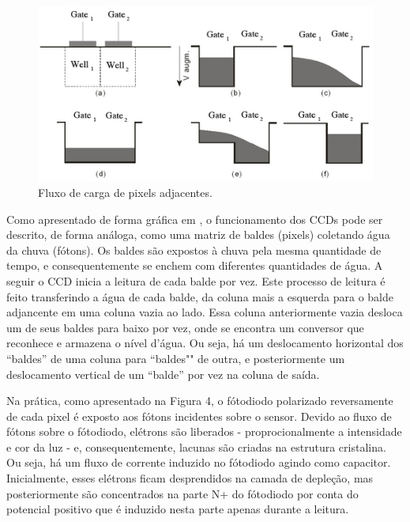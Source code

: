 \documentclass[10pt,a4paper,twocolumn]{article}
\begin{document}
	\begin{figure}[!h]
		\centering
		\includegraphics[scale=0.5]{imagens/ccd.jpg}
		\caption{Fluxo de carga de pixels adjacentes.}
	\end{figure}
		
	Como apresentado de forma gráfica em \cite{Spectral}, o funcionamento dos CCDs pode ser descrito, de forma análoga, como uma matriz de baldes (pixels) coletando água da chuva (fótons). Os baldes são expostos à chuva pela mesma quantidade de tempo, e consequentemente se enchem com diferentes quantidades de água. A seguir o CCD inicia a leitura de cada balde por vez. Este processo de leitura é feito transferindo a água de cada balde, da coluna mais a esquerda para o balde adjancente em uma coluna vazia ao lado. Essa coluna anteriormente vazia desloca um de seus baldes para baixo por vez, onde se encontra um conversor que reconhece e armazena o nível d'água. Ou seja, há um deslocamento horizontal dos ``baldes'' de uma coluna para ``baldes"" de outra, e posteriormente um deslocamento vertical de um ``balde'' por vez na coluna de saída.
	
	Na prática, como apresentado na Figura 4, o fótodiodo polarizado reversamente de cada pixel é exposto aos fótons incidentes sobre o sensor. Devido ao fluxo de fótons sobre o fótodiodo, elétrons são liberados - proprocionalmente a intensidade e cor da luz - e, consequentemente, lacunas são criadas na estrutura cristalina. Ou seja, há um fluxo de corrente induzido no fótodiodo agindo como capacitor. Inicialmente, esses elétrons ficam desprendidos na camada de depleção, mas posteriormente são concentrados na parte N+ do fótodiodo por conta do potencial positivo que é induzido nesta parte apenas durante a leitura.
	
\end{document}
